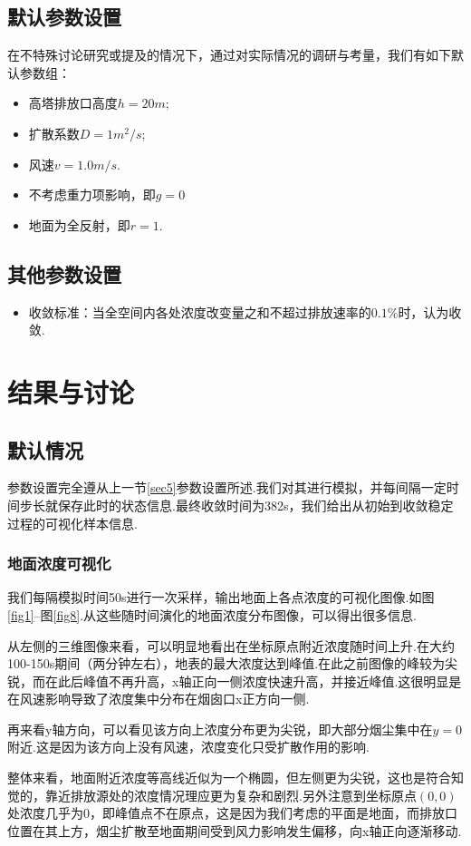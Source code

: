 \documentclass{article}
\begin{document}
	\subsection{默认参数设置}
	在不特殊讨论研究或提及的情况下，通过对实际情况的调研与考量，我们有如下默认参数组：
	\begin{itemize}
		\item 高塔排放口高度$h=20m$;
		\item 扩散系数$D=1m^2/s$;
		\item 风速$v=1.0m/s$.
		\item 不考虑重力项影响，即$g=0$
		\item 地面为全反射，即$r=1$.
	\end{itemize}

	\subsection{其他参数设置}
	\begin{itemize}
		\item 收敛标准：当全空间内各处浓度改变量之和不超过排放速率的$0.1\%$时，认为收敛.
	\end{itemize}
	
	\section{结果与讨论}\label{sec6}
	\subsection{默认情况}\label{sec7}
	参数设置完全遵从上一节\cref{sec5}参数设置所述.我们对其进行模拟，并每间隔一定时间步长就保存此时的状态信息.最终收敛时间为382s，我们给出从初始到收敛稳定过程的可视化样本信息.
	\subsubsection{地面浓度可视化}
	我们每隔模拟时间50s进行一次采样，输出地面上各点浓度的可视化图像.如图\ref{fig1}--图\ref{fig8}.从这些随时间演化的地面浓度分布图像，可以得出很多信息.
	\par 从左侧的三维图像来看，可以明显地看出在坐标原点附近浓度随时间上升.在大约100-150s期间（两分钟左右），地表的最大浓度达到峰值.在此之前图像的峰较为尖锐，而在此后峰值不再升高，x轴正向一侧浓度快速升高，并接近峰值.这很明显是在风速影响导致了浓度集中分布在烟囱口x正方向一侧.
	\par 再来看y轴方向，可以看见该方向上浓度分布更为尖锐，即大部分烟尘集中在$y=0$附近.这是因为该方向上没有风速，浓度变化只受扩散作用的影响.
	\par 整体来看，地面附近浓度等高线近似为一个椭圆，但左侧更为尖锐，这也是符合知觉的，靠近排放源处的浓度情况理应更为复杂和剧烈.另外注意到坐标原点$(0,0)$处浓度几乎为0，即峰值点不在原点，这是因为我们考虑的平面是地面，而排放口位置在其上方，烟尘扩散至地面期间受到风力影响发生偏移，向x轴正向逐渐移动.
	
\end{document}
